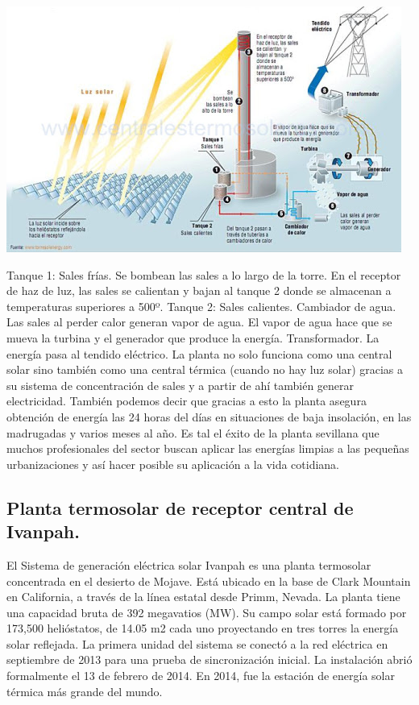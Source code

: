 \includegraphics[scale=1]{unnamed (8).jpg}

Tanque 1: Sales frías.
Se bombean las sales a lo largo de la torre.
En el receptor de haz de luz, las sales se calientan y bajan al tanque 2 donde se almacenan a temperaturas superiores a 500º.
Tanque 2: Sales calientes.
Cambiador de agua.
Las sales al perder calor generan vapor de agua.
El vapor de agua hace que se mueva la turbina y el generador que produce la energía.
Transformador. La energía pasa al tendido eléctrico.
La planta no solo funciona como una central solar sino también como una central térmica (cuando no hay luz solar) gracias a su sistema de concentración de sales y a partir de ahí también generar electricidad. También podemos decir que gracias a esto la planta asegura obtención de energía las 24 horas del días en situaciones de baja insolación, en las madrugadas y varios meses al año.
Es tal el éxito de la planta sevillana que muchos profesionales del sector buscan aplicar las energías limpias a las pequeñas urbanizaciones y así hacer posible su aplicación a la vida cotidiana. \cite{PonsWebSite}



\subsection{Planta termosolar de receptor central de Ivanpah.}

El Sistema de generación eléctrica solar Ivanpah es una planta termosolar concentrada en el desierto de Mojave. Está ubicado en la base de Clark Mountain en California, a través de la línea estatal desde Primm, Nevada. La planta tiene una capacidad bruta de 392 megavatios (MW). Su campo solar está formado por 173,500 helióstatos, de 14.05 m2 cada uno proyectando en tres torres la energía solar reflejada. La primera unidad del sistema se conectó a la red eléctrica en septiembre de 2013 para una prueba de sincronización inicial. La instalación abrió formalmente el 13 de febrero de 2014. En 2014, fue la estación de energía solar térmica más grande del mundo.
 
